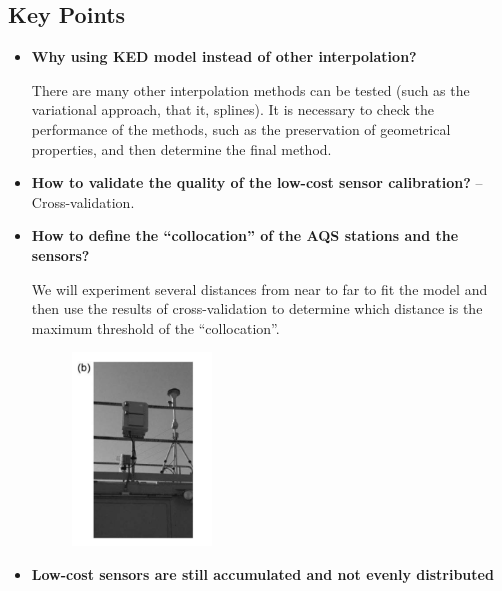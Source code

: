 \documentclass{article}
\begin{document}
\subsection{Key Points}
\begin{itemize}
    \item \textbf{Why using KED model instead of other interpolation?} {
    
    There are many other interpolation methods can be tested (such as the variational approach, that it, splines). It is necessary to check the performance of the methods, such as the preservation of geometrical properties, and then determine the final method.
    }
    \item \textbf{How to validate the quality of the low-cost sensor calibration?} -- Cross-validation.
    \item \textbf{How to define the ``collocation'' of the AQS stations and the sensors?} {
    
    We will experiment several distances from near to far to fit the model and then use the results of cross-validation to determine which distance is the maximum threshold of the ``collocation''.
    \begin{figure}[H]
        \centering
        \includegraphics[width=0.35\textwidth]{img/collocation.png}
        \label{fig:col}
    \end{figure}
    }
    \item \textbf{Low-cost sensors are still accumulated and not evenly distributed} {
    
}
\end{itemize}
\end{document}
